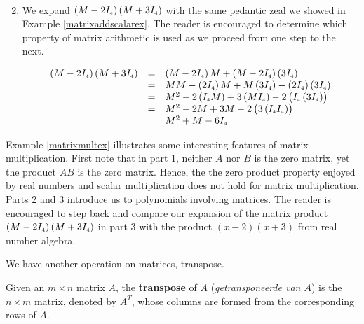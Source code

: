 \begin{example}
\begin{enumerate}
\[\begin{array}{rcl}
		
		\end{array} \]
		
		\item  We expand $\left(M - 2I_{\mbox{\tiny$4$}}\right)\left(M + 3I_{\mbox{\tiny$4$}}\right)$ with the same pedantic zeal we showed in Example \ref{matrixaddscalarex}. The reader is encouraged to determine which property of matrix arithmetic is used as we proceed from one step to the next.
		
		\[\begin{array}{rcl}
		
		\left(M - 2I_{\mbox{\tiny$4$}}\right)\left(M + 3I_{\mbox{\tiny$4$}}\right) & = & \left(M - 2I_{\mbox{\tiny$4$}}\right) M + \left(M - 2I_{\mbox{\tiny$4$}}\right)\left( 3I_{\mbox{\tiny$4$}}\right) \\
		& = & MM - \left(2I_{\mbox{\tiny$4$}}\right)M + M\left( 3I_{\mbox{\tiny$4$}}\right) - \left( 2I_{\mbox{\tiny$4$}}\right)\left( 3I_{\mbox{\tiny$4$}}\right) \\
		& = & M^2 -2 \left(I_{\mbox{\tiny$4$}}M\right) +3\left( M I_{\mbox{\tiny$4$}}\right) - 2\left( I_{\mbox{\tiny$4$}}\left( 3I_{\mbox{\tiny$4$}}\right)\right) \\
		& = & M^2 - 2M  + 3M - 2\left(3\left( I_{\mbox{\tiny$4$}}I_{\mbox{\tiny$4$}}\right)\right) \\
		& = & M^2 +M  - 6I_{\mbox{\tiny$4$}}  \\
		
		\end{array}\]
		
	
	\end{enumerate}
	
\end{example}

Example \ref{matrixmultex} illustrates some interesting features of matrix multiplication.  First note that in part 1, neither $A$ nor $B$ is the zero matrix, yet the product $AB$ is the zero matrix.  Hence, the the zero product property enjoyed by real numbers and scalar multiplication does not hold for matrix multiplication. Parts 2 and 3 introduce us to polynomials involving matrices.  The reader is encouraged to step back and compare our expansion of the matrix product $\left(M - 2I_{\mbox{\tiny$4$}}\right)\left(M + 3I_{\mbox{\tiny$4$}}\right)$ in part 3 with the product $(x-2)(x+3)$ from real number algebra.  


\smallskip
We have another operation on matrices, transpose.

\begin{definition} \label{transpose}
Given an $m \times n$ matrix $A$, the \textbf{transpose} of $A$ (\textit{getransponeerde van $A$}) is the $n \times m$ matrix, denoted by $A^T$, whose columns are formed from the corresponding rows of $A$.
\end{definition}


